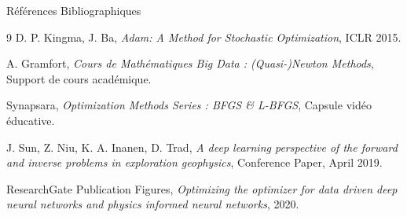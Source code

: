 \documentclass{beamer}
\begin{document}
\begin{frame}{Références Bibliographiques}
    \begin{thebibliography}{9}
        D. P. Kingma, J. Ba, 
        \emph{Adam: A Method for Stochastic Optimization}, 
        ICLR 2015.
        
        A. Gramfort, 
        \emph{Cours de Mathématiques Big Data : (Quasi-)Newton Methods}, 
        Support de cours académique.
        
        Synapsara, 
        \emph{Optimization Methods Series : BFGS \& L-BFGS}, 
        Capsule vidéo éducative.
        
        J. Sun, Z. Niu, K. A. Inanen, D. Trad,
        \emph{A deep learning perspective of the forward and inverse problems in exploration geophysics},
        Conference Paper, April 2019.
        
        ResearchGate Publication Figures,
        \emph{Optimizing the optimizer for data driven deep neural networks and physics informed neural networks},
        2020.
        
    \end{thebibliography}
\end{frame}
\end{document}
